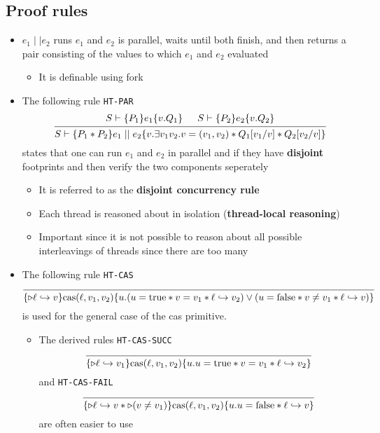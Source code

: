 \subsection{Proof rules}
\begin{itemize}
	\item $e_1 \mid \mid e_2$ runs $e_1$ and $e_2$ is parallel, waits until both finish, and then returns a pair consisting of the values to which $e_1$ and $e_2$ evaluated 
  \begin{itemize}
  	\item It is definable using fork
  \end{itemize}
  \item The following rule \texttt{HT-PAR}
  \[
  \begin{prooftree} 
    \hypo{S \vdash \{P_1\}e_1 \{v.Q_1\}}
    \hypo{S \vdash \{P_2\}e_2 \{v.Q_2\}} 
    \infer2{S \vdash \{P_1 * P_2\} e_1 \mid \mid e_2 \{v. \exists v_1v_2.v = (v_1,v_2) * Q_1[v_1/v] * Q_2[v_2/v]\}} 
  \end{prooftree}
  \]
  states that one can run $e_1$ and $e_2$ in parallel and if they have \textbf{disjoint} footprints and then verify the two components seperately 
  \begin{itemize}
    \item It is referred to as the \textbf{disjoint concurrency rule}
    \item Each thread is reasoned about in isolation (\textbf{thread-local reasoning}) 
  	\item Important since it is not possible to reason about all possible interleavings of threads since there are too many
  \end{itemize}
  \item The following rule \texttt{HT-CAS}
  \[
  \begin{prooftree} 
    \infer0{\{\later \ell \hookrightarrow v\} \text{cas}(\ell,v_1,v_2)\{u.(u = \true * v = v_1 * \ell \hookrightarrow v_2) \lor (u = \false * v \neq v_1 * \ell \hookrightarrow v)\}} 
  \end{prooftree}
  \]
  is used for the general case of the cas primitive. 
  \begin{itemize}
    \item The derived rules \texttt{HT-CAS-SUCC}
    \[
    \begin{prooftree} 
      \infer0{\{\later \ell \hookrightarrow v_1\} \text{cas}(\ell,v_1,v_2)\{u.u = \true * v = v_1 * \ell \hookrightarrow v_2\}} 
    \end{prooftree}
    \]
    and \texttt{HT-CAS-FAIL} 
    \[
    \begin{prooftree} 
      \infer0{\{\later \ell \hookrightarrow v * \later(v \neq v_1)\} \text{cas}(\ell,v_1,v_2)\{u.u = \false * \ell \hookrightarrow v\}} 
    \end{prooftree}
    \]
    are often easier to use
  \end{itemize}
\end{itemize}
